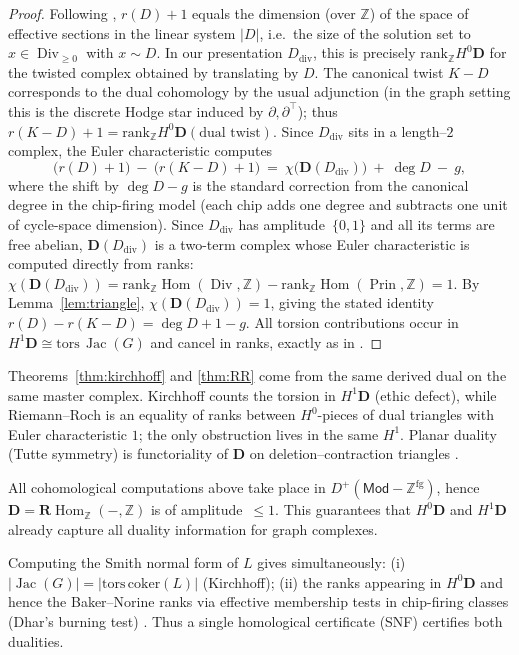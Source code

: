 \documentclass[12pt]{article}
\DeclareMathOperator{\Div}{Div}
\DeclareMathOperator{\Prin}{Prin}
\DeclareMathOperator{\Jac}{Jac}
\newcommand{\Mod}{\mathsf{Mod}}
\newcommand{\ZZ}{\mathbb{Z}}
\newcommand{\Hom}{\operatorname{Hom}}
\newcommand{\RHom}{\mathbf{R}\!\operatorname{Hom}}
\theoremstyle{plain}
\theoremstyle{definition}
\theoremstyle{remark}
\numberwithin{equation}{section}
\begin{document}
\begin{proof}
Following \cite{BakerNorine2007}, $r(D)+1$ equals the dimension (over $\ZZ$) of the space of effective sections in the linear system $|D|$, i.e.\ the size of the solution set to $x\in \Div_{\ge 0}$ with $x\sim D$. In our presentation $D_{\mathrm{div}}$, this is precisely $\mathrm{rank}_\ZZ H^0\mathbf D$ for the twisted complex obtained by translating by $D$. The canonical twist $K-D$ corresponds to the dual cohomology by the usual adjunction (in the graph setting this is the discrete Hodge star induced by $\partial,\partial^\top$); thus $r(K-D)+1=\mathrm{rank}_\ZZ H^0\mathbf D(\text{dual twist})$. Since $D_{\mathrm{div}}$ sits in a length--$2$ complex, the Euler characteristic computes
\[
\bigl(r(D)+1\bigr)\ -\ \bigl(r(K-D)+1\bigr)\ =\ \chi\bigl(\mathbf D(D_{\mathrm{div}})\bigr)\ +\ \deg D\ -\ g,
\]
where the shift by $\deg D - g$ is the standard correction from the canonical degree in the chip-firing model (each chip adds one degree and subtracts one unit of cycle-space dimension). Since $D_{\mathrm{div}}$ has amplitude~$\{0,1\}$ and all its terms are
free abelian, $\mathbf D(D_{\mathrm{div}})$ is a two-term complex whose
Euler characteristic is computed directly from ranks:
$\chi(\mathbf D(D_{\mathrm{div}}))
=\mathrm{rank}_\ZZ\Hom(\Div,\ZZ)
-\mathrm{rank}_\ZZ\Hom(\Prin,\ZZ)=1$. By Lemma~\ref{lem:triangle}, $\chi(\mathbf D(D_{\mathrm{div}}))=1$, giving the stated identity
\(
r(D)-r(K-D)=\deg D+1-g.
\)
All torsion contributions occur in $H^1\mathbf D\cong \mathrm{tors}\,\Jac(G)$ and cancel in ranks, exactly as in \cite{BakerNorine2007}.
\end{proof}

Theorems~\ref{thm:kirchhoff} and \ref{thm:RR} come from the same derived dual on the same master complex. Kirchhoff counts the torsion in $H^1\mathbf D$ (ethic defect), while Riemann–Roch is an equality of ranks between $H^0$-pieces of dual triangles with Euler characteristic $1$; the only obstruction lives in the same $H^1$. Planar duality (Tutte symmetry) is functoriality of $\mathbf D$ on deletion–contraction triangles \cite{Tutte1954,Biggs1993}.

All cohomological computations above take place in
$D^+(\Mod\!-\!\ZZ^{\mathrm{fg}})$, hence $\mathbf D=\RHom_\ZZ(-,\ZZ)$
is of amplitude~$\le1$.  This guarantees that
$H^0\mathbf D$ and $H^1\mathbf D$ already capture
all duality information for graph complexes.

Computing the Smith normal form of $L$ gives simultaneously: (i) $|\Jac(G)|=|\mathrm{tors}\,\mathrm{coker}(L)|$ (Kirchhoff); (ii) the ranks appearing in $H^0\mathbf D$ and hence the Baker–Norine ranks via effective membership tests in chip-firing classes (Dhar's burning test) \cite{Dhar1990}. Thus a single homological certificate (SNF) certifies both dualities.
\end{document}

